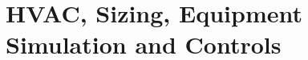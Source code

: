 \chapter{HVAC, Sizing, Equipment Simulation and Controls}\label{hvac-sizing-equipment-simulation-and-controls}
